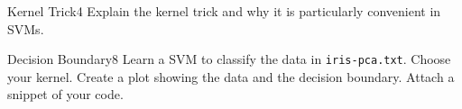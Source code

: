 \begin{questions}

\begin{question}{Kernel Trick}{4}
Explain the kernel trick and why it is particularly convenient in SVMs.

\begin{answer}\end{answer}
\end{question}


\begin{question}{Decision Boundary}{8}
Learn a SVM to classify the data in \texttt{iris-pca.txt}. Choose your kernel. Create a plot showing the data and the decision boundary. Attach a snippet of your code.

\begin{answer}\end{answer}

\end{question}

\end{questions}
